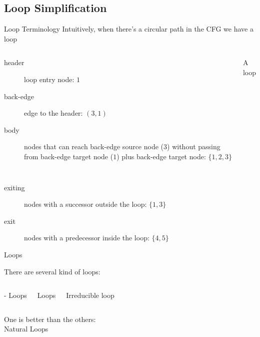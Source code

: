 \subsection{Loop Simplification}


\begin{frame}{Loop Terminology}
Intuitively, when there's a circular path in the CFG we have a loop
\begin{columns}[t]

\begin{description}
\item[header] loop entry node: $1$
\item[back-edge] edge to the header: $(3,1)$
\item[body] nodes that can reach back-edge source node ($3$) without passing
            from back-edge target node ($1$) plus back-edge target node:
            $\{1 ,2, 3\}$
\end{description}

\begin{block}{\small A loop}

\end{block}

\end{columns}

\begin{description}
\item[exiting] nodes with a successor outside the loop: $\{1, 3\}$
\item[exit] nodes with a predecessor inside the loop: $\{4, 5\}$
\end{description}
\end{frame}


\begin{frame}{Loops}
\begin{center}
There are several kind of loops:

\begin{columns}[t]
\begin{block}{- Loops}
\centering

\end{block}

\begin{block}{ Loops}
\centering

\end{block}

\begin{block}{Irreducible loop}
\centering

\end{block}
\end{columns}

\bigskip
One is better than the others:\\
\alert{Natural Loops}
\end{center}
\end{frame}


